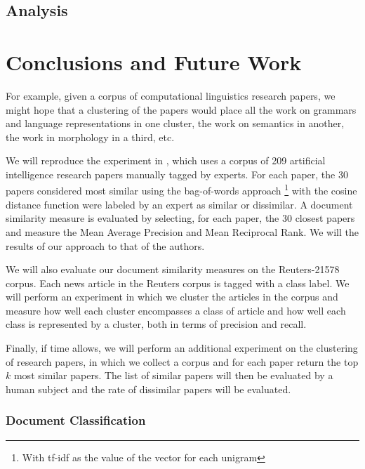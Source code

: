 \documentclass[11pt]{article}
\begin{document}
\subsection{Analysis}


\section{Conclusions and Future Work}






 
\clearpage

For example, given a corpus of computational linguistics research papers, we might hope that a clustering of the papers would place all the work on grammars and language representations in one cluster, the work on semantics in another, the work in morphology in a third, etc. 

We will reproduce the experiment in \cite{Hurtado2013},  which uses a corpus of 209 artificial intelligence research papers manually tagged by experts. For each paper, the 30 papers considered most similar using the bag-of-words approach \footnote{With tf-idf as the value of the vector for each unigram} with  the cosine distance function were labeled by an expert as similar or dissimilar. A document similarity measure is evaluated by selecting, for each paper, the 30 closest papers and measure the Mean Average Precision and Mean Reciprocal Rank. We will the results of our approach to that of the authors. 

We will also evaluate our document similarity measures on the Reuters-21578 corpus. Each news article in the Reuters corpus is tagged with a class label. We will perform an experiment in which we cluster the articles in the corpus and measure how well each cluster encompasses a class of article and how well each class is represented by a cluster, both in terms of precision and recall. 

Finally, if time allows, we will perform an additional experiment on the clustering of research papers, in which we collect a corpus and for each paper return the top $k$ most similar papers. The list of similar papers will then be evaluated by a human subject and the rate of dissimilar papers will be evaluated. 

\subsubsection{Document Classification} \label{sec:DocumentClassification}
\end{document}
